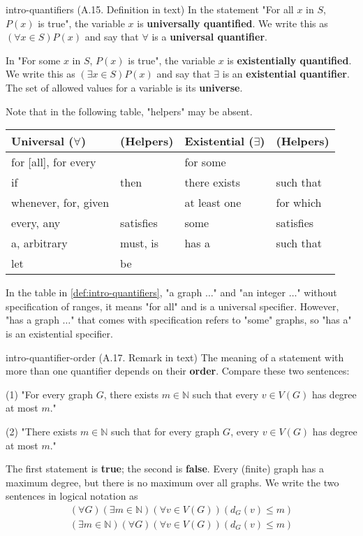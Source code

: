 \documentclass[../src/handouts/main.tex]{subfiles}
\begin{document}
\begin{definition}{}{intro-quantifiers}
  (A.15. Definition in text)
  In the statement "For all $x$ in $S$, $P(x)$ is true", the variable $x$ is \textbf{universally quantified}. We write this as $(\forall x \in S) P(x)$ and say that $\forall$ is a \textbf{universal quantifier}.

  In "For some $x$ in $S$, $P(x)$ is true", the variable $x$ is \textbf{existentially quantified}. We write this as $(\exists x \in S) P(x)$ and say that $\exists$ is an \textbf{existential quantifier}. The set of allowed values for a variable is its \textbf{universe}.

  Note that in the following table, "helpers" may be absent.

  \centering
  \begin{tabular}{ll|ll}
    Universal ($\forall$) & (Helpers) & Existential ($\exists$) & (Helpers) \\ \hline
    for [all], for every  &           & for some                &           \\
    if                    & then      & there exists            & such that \\
    whenever, for, given  &           & at least one            & for which \\
    every, any            & satisfies & some                    & satisfies \\
    a, arbitrary          & must, is  & has a                   & such that \\
    let                   & be        &                         &
  \end{tabular}
\end{definition}

In the table in \cref{def:intro-quantifiers}, "a graph $\ldots$" and "an integer $\ldots$" without specification of ranges, it means "for all" and is a universal specifier. However, "has a graph $\ldots$" that comes with specification refers to "some" graphs, so "has a" is an existential specifier.

\begin{remark}{}{intro-quantifier-order}
  (A.17. Remark in text)
  The meaning of a statement with more than one quantifier depends on their \textbf{order}. Compare these two sentences:

  (1) "For every graph $G$, there exists $m \in \mathbb{N}$ such that every $v \in V(G)$ has degree at most $m$."

  (2) "There exists $m \in \mathbb{N}$ such that for every graph $G$, every $v \in V(G)$ has degree at most $m$."

  The first statement is \textbf{true}; the second is \textbf{false}.
  Every (finite) graph has a maximum degree, but there is no maximum over all graphs.
  We write the two sentences in logical notation as
  $$
    \begin{aligned}
      (\forall G)(\exists m \in \mathbb{N})(\forall v \in V(G))\left(d_G(v) \leq m\right) \\
      (\exists m \in \mathbb{N})(\forall G)(\forall v \in V(G))\left(d_G(v) \leq m\right)
    \end{aligned}
  $$
\end{remark}
\end{document}
